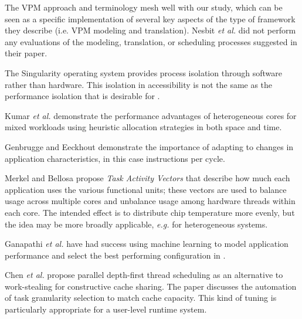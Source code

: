 The VPM approach and terminology mesh well with our study, which can be seen as a specific implementation of several key aspects of the type of framework they describe (i.e. VPM modeling and translation). Nesbit \emph{et al.} did not perform any evaluations of the modeling, translation, or scheduling processes suggested in their paper.

The Singularity operating system\cite{aiken-mspc06} provides process isolation through software rather than hardware.  This isolation in accessibility is not the same as the performance isolation that is desirable for \pacora.

Kumar \emph{et al.}\cite{1006707} demonstrate the performance advantages of heterogeneous cores for mixed workloads using heuristic allocation strategies in both space and time.

Genbrugge and Eeckhout\cite{genbrugge-isca07} demonstrate the importance of adapting to changes in application characteristics, in this case instructions per cycle.

Merkel and Bellosa\cite{merkel-eurosys08} propose \emph{Task Activity Vectors} that describe how much each application uses the various functional units; these vectors are used to balance usage across multiple cores and unbalance usage among hardware threads within each core.
The intended effect is to distribute chip temperature more evenly, but the idea may be more broadly applicable, \emph{e.g.} for heterogeneous systems.

Ganapathi \emph{et al.} have had success using machine learning to model application performance and select the best performing configuration in \cite{Archana}.


%
Chen \emph{et al.}\cite{1248396} propose parallel depth-first thread scheduling as an alternative to work-stealing for constructive cache sharing.
The paper discusses the automation of task granularity selection to match cache capacity. This kind of tuning is particularly appropriate for a user-level runtime system.
